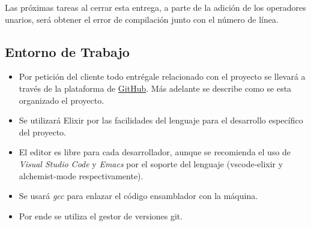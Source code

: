 \documentclass{article}
\begin{document}
\begin{figure}[H]
  \centering
\end{figure}
\begin{figure}[H]
\end{figure}

Las próximas tareas al cerrar esta entrega, a parte de la adición de los
operadores unarios, será obtener el error de compilación junto con el número
de línea.



\subsection{Entorno de Trabajo}
\begin{itemize}
\item  Por petición del cliente todo entrégale relacionado con
  el proyecto se llevará a través de la plataforma de \href{https://github.com}
  {GitHub}.
  Más adelante se describe como se esta organizado el proyecto.
\item Se utilizará Elixir por las facilidades del lenguaje para el desarrollo
  específico del proyecto.
\item El editor es libre para cada desarrollador, aunque se recomienda el uso
  de \textit{Visual Studio Code} y \textit{Emacs} por el soporte del lenguaje
  (vscode-elixir y alchemist-mode respectivamente).
  
\item Se usará \textit{gcc} para enlazar el código ensamblador con la máquina.
\item Por ende se utiliza el gestor de versiones git.

\end{itemize}
\end{document}
